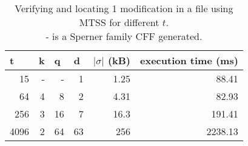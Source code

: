 \begin{table}[ht]
\centering
\begin{tabular}{rrrrrr}
\hline
\multicolumn{1}{|l|}{\textbf{t}} &
\multicolumn{1}{l|}{\textbf{k}} &
\multicolumn{1}{l|}{\textbf{q}} &
\multicolumn{1}{l|}{\textbf{d}} &
\multicolumn{1}{l|}{\textbf{$|\sigma|$ (kB)}} &
\multicolumn{1}{l|}{\textbf{execution time (ms)}} \\
\hline
15   & - & -  & 1  & 1.25 & 88.41  \\
64   & 4 & 8  & 2  & 4.31 & 82.93  \\
256  & 3 & 16 & 7  & 16.3 & 191.41 \\
4096 & 2 & 64 & 63 & 256  & 2238.13
\end{tabular}
    \caption{Verifying and locating 1 modification in a file using MTSS for different $t$. \\ - is a Sperner family CFF generated.}
    \label{table:verify-modified-block-t}
\end{table}
